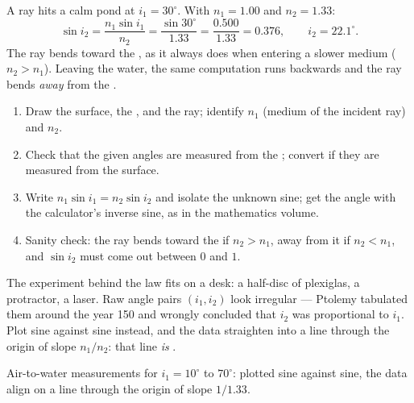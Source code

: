 \begin{example}\label{ex:g10:refraction:airwater}
A ray hits a calm pond at $i_1 = 30^\circ$. With $n_1 = 1.00$ and
$n_2 = 1.33$:
\[
\sin i_2 = \frac{n_1 \sin i_1}{n_2} = \frac{\sin 30^\circ}{1.33}
= \frac{0.500}{1.33} = 0.376,
\qquad
i_2 = 22.1^\circ .
\]
The ray bends toward the , as it always does when entering a
slower medium ($n_2 > n_1$). Leaving the water, the same computation runs
backwards and the ray bends \emph{away} from the .
\end{example}

\begin{method}\label{met:g10:refraction:method}
\begin{enumerate}
  \item Draw the surface, the , and the ray; identify $n_1$
        (medium of the incident ray) and $n_2$.
  \item Check that the given angles are measured from the ;
        convert if they are measured from the surface.
  \item Write $n_1 \sin i_1 = n_2 \sin i_2$ and isolate the unknown
        sine; get the angle with the calculator's inverse sine, as in
        the mathematics volume.
  \item Sanity check: the ray bends toward the  if $n_2 > n_1$,
        away from it if $n_2 < n_1$, and $\sin i_2$ must come out
        between $0$ and $1$.
\end{enumerate}
\end{method}

The experiment behind the law fits on a desk: a half-disc of plexiglas,
a protractor, a laser. Raw angle pairs $(i_1, i_2)$ look irregular ---
Ptolemy tabulated them around the year 150 and wrongly concluded that
$i_2$ was proportional to $i_1$. Plot sine against sine instead, and the
data straighten into a line through the origin of slope $n_1/n_2$: that
line \emph{is} .

\begin{omfigure}

{\small Air-to-water measurements for $i_1 = 10^\circ$ to $70^\circ$:
plotted sine against sine, the data align on a line through the origin
of slope $1/1.33$.}
\end{omfigure}

